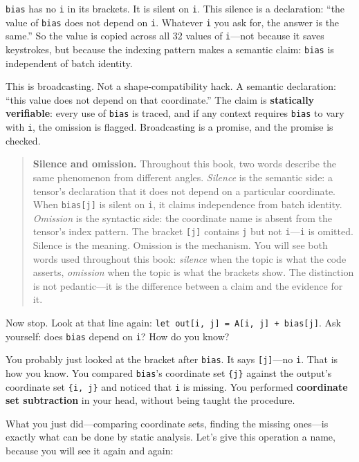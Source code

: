 \documentclass[11pt,titlepage]{article}
\begin{document}
\texttt{bias} has no \texttt{i} in its brackets. It is silent on
\texttt{i}. This silence is a declaration: ``the value of \texttt{bias}
does not depend on \texttt{i}. Whatever \texttt{i} you ask for, the
answer is the same.'' So the value is copied across all 32 values of
\texttt{i}---not because it saves keystrokes, but because the indexing
pattern makes a semantic claim: \texttt{bias} is independent of batch
identity.

This is broadcasting. Not a shape-compatibility hack. A semantic
declaration: ``this value does not depend on that coordinate.'' The
claim is \textbf{statically verifiable}: every use of \texttt{bias} is
traced, and if any context requires \texttt{bias} to vary with
\texttt{i}, the omission is flagged. Broadcasting is a promise, and the
promise is checked.

\begin{quote}
\textbf{Silence and omission.} Throughout this book, two words describe
the same phenomenon from different angles. \emph{Silence} is the
semantic side: a tensor's declaration that it does not depend on a
particular coordinate. When \texttt{bias{[}j{]}} is silent on
\texttt{i}, it claims independence from batch identity. \emph{Omission}
is the syntactic side: the coordinate name is absent from the tensor's
index pattern. The bracket \texttt{{[}j{]}} contains \texttt{j} but not
\texttt{i}---\texttt{i} is omitted. Silence is the meaning. Omission is
the mechanism. You will see both words used throughout this book:
\emph{silence} when the topic is what the code asserts, \emph{omission}
when the topic is what the brackets show. The distinction is not
pedantic---it is the difference between a claim and the evidence for it.
\end{quote}

Now stop. Look at that line again:
\texttt{let\ out{[}i,\ j{]}\ =\ A{[}i,\ j{]}\ +\ bias{[}j{]}}. Ask
yourself: does \texttt{bias} depend on \texttt{i}? How do you know?

You probably just looked at the bracket after \texttt{bias}. It says
\texttt{{[}j{]}}---no \texttt{i}. That is how you know. You compared
\texttt{bias}'s coordinate set \texttt{\{j\}} against the output's
coordinate set \texttt{\{i,\ j\}} and noticed that \texttt{i} is
missing. You performed \textbf{coordinate set subtraction} in your head,
without being taught the procedure.

What you just did---comparing coordinate sets, finding the missing
ones---is exactly what can be done by static analysis. Let's give this
operation a name, because you will see it again and again:
\end{document}
